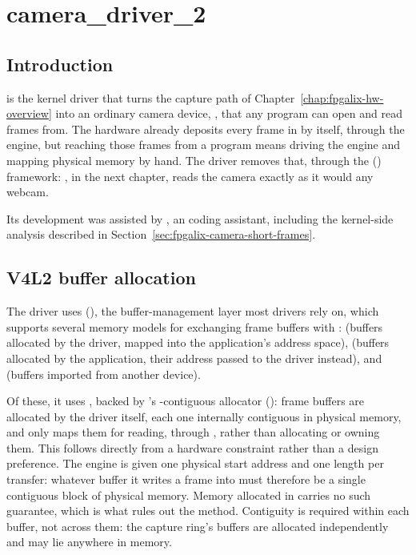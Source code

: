 \chapter{camera\_driver\_2}
\label{chap:fpgalix-camera-driver-2}

\section{Introduction}
\label{sec:fpgalix-camera-intro}

 is the kernel driver that turns the  capture path of Chapter~\ref{chap:fpgalix-hw-overview} into an ordinary  camera device, , that any program can open and read frames from. The hardware already deposits every frame in  by itself, through the   engine, but reaching those frames from a program means driving the  engine and mapping physical memory by hand. The driver removes that, through the  () framework: , in the next chapter, reads the camera exactly as it would any  webcam.

Its development was assisted by , an  coding assistant, including the kernel-side analysis described in Section~\ref{sec:fpgalix-camera-short-frames}.

\section{V4L2 buffer allocation}
\label{sec:fpgalix-camera-buffer-allocation}

The driver uses  (), the buffer-management layer most  drivers rely on, which supports several memory models for exchanging frame buffers with :  (buffers allocated by the driver, mapped into the application's address space),  (buffers allocated by the application, their address passed to the driver instead), and  (buffers imported from another device).

Of these, it uses , backed by 's -contiguous allocator (): frame buffers are allocated by the driver itself, each one internally contiguous in physical memory, and  only maps them for reading, through , rather than allocating or owning them. This follows directly from a hardware constraint rather than a design preference. The  engine is given one physical start address and one length per transfer: whatever buffer it writes a frame into must therefore be a single contiguous block of physical memory. Memory allocated in  carries no such guarantee, which is what rules out the  method. Contiguity is required within each buffer, not across them: the capture ring's buffers are allocated independently and may lie anywhere in memory.

